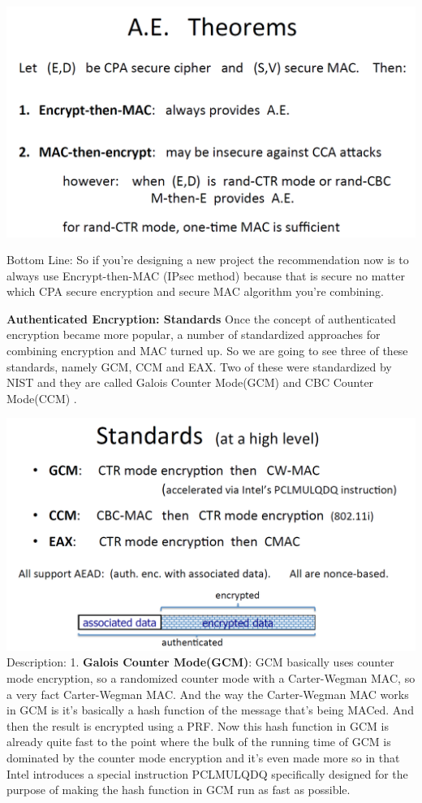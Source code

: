 \documentclass[11pt]{article}
\makeatletter
\def\maxwidth{\ifdim\Gin@nat@width>\linewidth\linewidth
    \else\Gin@nat@width\fi}
\let\Oldincludegraphics\includegraphics
\renewcommand{\includegraphics}[1]{\Oldincludegraphics[width=.8\maxwidth]{#1}}
\makeatother
\begin{document}
\includegraphics{./Images/AE-Theorems.png}

Bottom Line: So if you're designing a new project the recommendation now
is to always use Encrypt-then-MAC (IPsec method) because that is secure
no matter which CPA secure encryption and secure MAC algorithm you're
combining.

\textbf{Authenticated Encryption: Standards} Once the concept of
authenticated encryption became more popular, a number of standardized
approaches for combining encryption and MAC turned up. So we are going
to see three of these standards, namely GCM, CCM and EAX. Two of these
were standardized by NIST and they are called Galois Counter Mode(GCM)
and CBC Counter Mode(CCM) .

\includegraphics{./Images/AE-Standards.png} Description: 1.
\textbf{Galois Counter Mode(GCM)}: GCM basically uses counter mode
encryption, so a randomized counter mode with a Carter-Wegman MAC, so a
very fact Carter-Wegman MAC. And the way the Carter-Wegman MAC works in
GCM is it's basically a hash function of the message that's being MACed.
And then the result is encrypted using a PRF. Now this hash function in
GCM is already quite fast to the point where the bulk of the running
time of GCM is dominated by the counter mode encryption and it's even
made more so in that Intel introduces a special instruction PCLMULQDQ
specifically designed for the purpose of making the hash function in GCM
run as fast as possible.
\end{document}
